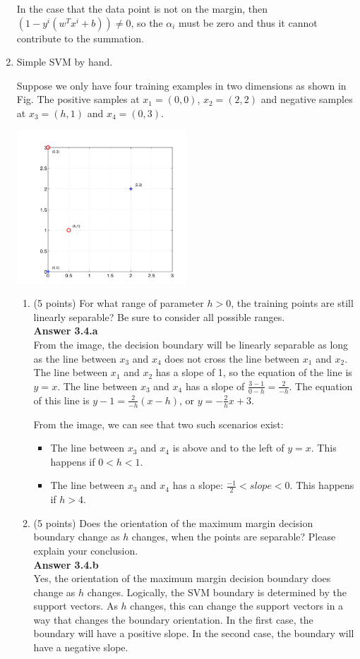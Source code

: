 \documentclass[twoside,10pt]{article}
\begin{document}
\begin{enumerate}
In the case that the data point is not on the margin, then $(1-y^i(w^Tx^i + b)) \neq 0$, so the $\alpha_i$ must be zero and thus it cannot contribute to the summation.

\item Simple SVM by hand. 

Suppose we only have four training examples in two dimensions as shown in Fig. The positive samples at $x_1 = (0, 0)$, $x_2 = (2, 2)$ and negative samples at $x_3 = (h, 1)$ and $x_4 = (0, 3)$. 
%
\begin{center}
\includegraphics[width = 0.5\textwidth]{svm}
\end{center}

\begin{enumerate}
\item (5 points) For what range of parameter $h > 0$, the training points are still linearly separable? Be sure to consider all possible ranges.
\\{\bf Answer 3.4.a} \\
From the image, the decision boundary will be linearly separable as long as the line between $x_3$ and $x_4$ does not cross the line between $x_1$ and $x_2$.
The line between $x_1$ and $x_2$ has a slope of 1, so the equation of the line is $y = x$. The line between $x_3$ and $x_4$ has a slope of $\frac{3-1}{0-h} = \frac{2}{-h}$. The equation of this line is $y - 1 = \frac{2}{-h}(x - h)$, or $y = -\frac{2}{h}x + 3$.

From the image, we can see that two such scenarios exist:
\begin{itemize}
    \item The line between $x_3$ and $x_4$ is above and to the left of $y=x$. This happens if $0<h<1$.
    \item The line between $x_3$ and $x_4$ has a slope: $\frac{-1}{2} < slope < 0$. This happens if $h>4$.
\end{itemize}
\item (5 points) Does the orientation of the maximum margin decision boundary change as $h$ changes, when the points are separable? Please explain your conclusion.
\\ {\bf Answer 3.4.b} \\
Yes, the orientation of the maximum margin decision boundary does change as $h$ changes. Logically, the SVM boundary is determined by the support vectors. As $h$ changes, this can change the support vectors in a way that changes the boundary orientation. In the first case, the boundary will have a positive slope. In the second case, the boundary will have a negative slope.
\end{enumerate}



\end{enumerate}
\end{document}
